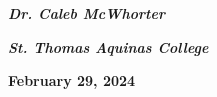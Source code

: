 \documentclass[11pt]{beamer}	%
\begin{document}
{\begin{frame}[plain]
\begin{center}
	{\bfseries\large\color{Topazolite}\textit{Dr. Caleb McWhorter} \par
	\bfseries\textit{St. Thomas Aquinas College}} \par\vspace{0cm}
\end{center} 

\begin{center}
	{\bfseries\small\color{Topazolite} February 29, 2024}
	\end{center} 
\end{frame}
}



















\end{document}
